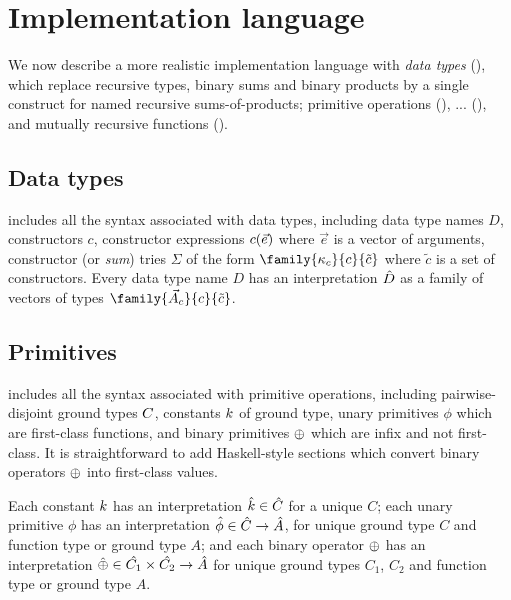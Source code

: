\section{Implementation language}

We now describe a more realistic implementation language with \emph{data types}
(), which replace recursive types, binary
sums and binary products by a single construct for named recursive
sums-of-products; primitive operations
(), ...
(), and mutually recursive functions
().

\subsection{Data types}
\label{sec:impl-language:data-types}

 includes all the syntax associated with data
types, including data type names $D$, constructors $c$, constructor expressions
$c(\vec{e})$ where $\vec{e}$ is a vector of arguments, constructor
(or \emph{sum}) tries $\Sigma$ of the form $\family{\kappa_c}{c}{\tilde{c}}$
where $\tilde{c}$ is a set of constructors. Every data type name $D$ has an
interpretation $\hat{D}$ as a family of vectors of types
$\family{\vec{A}_c}{c}{\tilde{c}}$.

\subsection{Primitives}
\label{sec:impl-language:primitives}




 includes all the syntax associated with primitive
operations, including pairwise-disjoint ground types $C$, constants
$k$ of ground type, unary primitives $\phi$ which are first-class
functions, and binary primitives $\oplus$ which are infix and not first-class.
It is straightforward to add Haskell-style sections which convert binary
operators $\oplus$ into first-class values.

Each constant $k$ has an interpretation $\hat{k} \in
\hat{C}$ for a unique $C$; each unary primitive $\phi$ has an
interpretation $\hat{\phi} \in \hat{C} \to \hat{A}$, for
unique ground type $C$ and function type or ground type $A$; and each binary
operator $\oplus$ has an interpretation $\hat{\oplus} \in
\hat{C_1} \times \hat{C_2} \to \hat{A}$ for unique ground
types $C_1$, $C_2$ and function type or ground type $A$.

